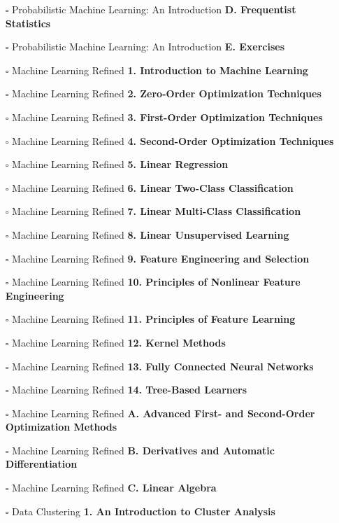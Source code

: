 \documentclass[a4, landscape, 12pt]{article}
\newcommand{\checkbox}{$\square$}%
\begin{document}
\begin{itemize}
{}
\item [\checkbox]  Probabilistic Machine Learning: An Introduction \textbf{ D. Frequentist Statistics
}
\item [\checkbox]  Probabilistic Machine Learning: An Introduction \textbf{ E. Exercises
}
\item [\checkbox]  Machine Learning Refined \textbf{ 1. Introduction to Machine Learning
}
\item [\checkbox]  Machine Learning Refined \textbf{ 2. Zero-Order Optimization Techniques
}
\item [\checkbox]  Machine Learning Refined \textbf{ 3. First-Order Optimization Techniques
}
\item [\checkbox]  Machine Learning Refined \textbf{ 4. Second-Order Optimization Techniques
}
\item [\checkbox]  Machine Learning Refined \textbf{ 5. Linear Regression
}
\item [\checkbox]  Machine Learning Refined \textbf{ 6. Linear Two-Class Classification
}
\item [\checkbox]  Machine Learning Refined \textbf{ 7. Linear Multi-Class Classification
}
\item [\checkbox]  Machine Learning Refined \textbf{ 8. Linear Unsupervised Learning
}
\item [\checkbox]  Machine Learning Refined \textbf{ 9. Feature Engineering and Selection
}
\item [\checkbox]  Machine Learning Refined \textbf{ 10. Principles of Nonlinear Feature Engineering
}
\item [\checkbox]  Machine Learning Refined \textbf{ 11. Principles of Feature Learning
}
\item [\checkbox]  Machine Learning Refined \textbf{ 12. Kernel Methods
}
\item [\checkbox]  Machine Learning Refined \textbf{ 13. Fully Connected Neural Networks
}
\item [\checkbox]  Machine Learning Refined \textbf{ 14. Tree-Based Learners
}
\item [\checkbox]  Machine Learning Refined \textbf{ A. Advanced First- and Second-Order Optimization Methods
}
\item [\checkbox]  Machine Learning Refined \textbf{ B. Derivatives and Automatic Differentiation
}
\item [\checkbox]  Machine Learning Refined \textbf{ C. Linear Algebra
}
\item [\checkbox]  Data Clustering \textbf{ 1. An Introduction to Cluster Analysis
}
\end{itemize}
\end{document}
